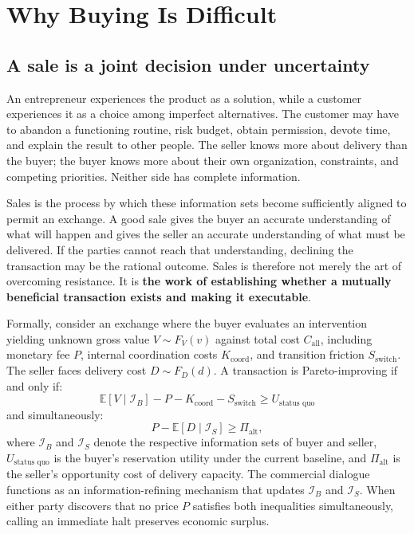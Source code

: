 \section{Why Buying Is Difficult}

\subsection{A sale is a joint decision under uncertainty}

An entrepreneur experiences the product as a solution, while a customer experiences it as a choice among imperfect alternatives. The customer may have to abandon a functioning routine, risk budget, obtain permission, devote time, and explain the result to other people. The seller knows more about delivery than the buyer; the buyer knows more about their own organization, constraints, and competing priorities. Neither side has complete information.

Sales is the process by which these information sets become sufficiently aligned to permit an exchange. A good sale gives the buyer an accurate understanding of what will happen and gives the seller an accurate understanding of what must be delivered. If the parties cannot reach that understanding, declining the transaction may be the rational outcome. Sales is therefore not merely the art of overcoming resistance. It is \textbf{the work of establishing whether a mutually beneficial transaction exists and making it executable}.

Formally, consider an exchange where the buyer evaluates an intervention yielding unknown gross value $V \sim F_V(v)$ against total cost $C_{\text{all}}$, including monetary fee $P$, internal coordination costs $K_{\text{coord}}$, and transition friction $S_{\text{switch}}$. The seller faces delivery cost $D \sim F_D(d)$. A transaction is Pareto-improving if and only if:
\begin{equation}
\mathbb{E}[V \mid \mathcal{I}_B] - P - K_{\text{coord}} - S_{\text{switch}} \ge U_{\text{status quo}}
\end{equation}
and simultaneously:
\begin{equation}
P - \mathbb{E}[D \mid \mathcal{I}_S] \ge \Pi_{\text{alt}},
\end{equation}
where $\mathcal{I}_B$ and $\mathcal{I}_S$ denote the respective information sets of buyer and seller, $U_{\text{status quo}}$ is the buyer's reservation utility under the current baseline, and $\Pi_{\text{alt}}$ is the seller's opportunity cost of delivery capacity. The commercial dialogue functions as an information-refining mechanism that updates $\mathcal{I}_B$ and $\mathcal{I}_S$. When either party discovers that no price $P$ satisfies both inequalities simultaneously, calling an immediate halt preserves economic surplus.

